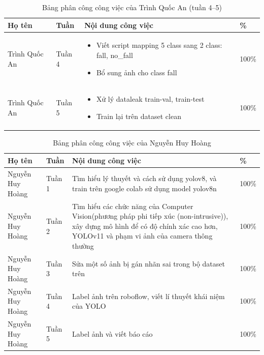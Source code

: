 \documentclass[12pt, a4paper]{article}
\begin{document}
\begin{table}[H]
  \centering
  \caption{Bảng phân công công việc của Trình Quốc An (tuần 4--5)}
  \label{tab:work_assignment_an_2}
  \renewcommand{\arraystretch}{1.2}
  \begin{tabularx}{\textwidth}{@{}p{3.6cm}p{1.4cm}X p{1.1cm}@{}}
    \toprule
    \textbf{Họ tên} & \textbf{Tuần} & \textbf{Nội dung công việc} & \textbf{\%} \\
    \midrule
    \addlinespace
    Trình Quốc An & Tuần 4 &
    \begin{itemize}[nosep, leftmargin=*]
      \item Viết script mapping 5 class sang 2 class: fall, no\_fall
      \item Bổ sung ảnh cho class fall
    \end{itemize}
    & 100\% \\
    \addlinespace
    Trình Quốc An & Tuần 5 &
    \begin{itemize}[nosep, leftmargin=*]
      \item Xử lý dataleak train-val, train-test
      \item Train lại trên dataset clean
    \end{itemize}
    & 100\% \\
    \bottomrule
  \end{tabularx}
\end{table}

\begin{table}[H]
  \centering
  \caption{Bảng phân công công việc của Nguyễn Huy Hoàng}
  \label{tab:work_assignment_hoang}
  \renewcommand{\arraystretch}{1.2}
  \begin{tabularx}{\textwidth}{@{}p{3.6cm}p{1.4cm}X p{1.1cm}@{}}
    \toprule
    \textbf{Họ tên} & \textbf{Tuần} & \textbf{Nội dung công việc} & \textbf{\%} \\
    \midrule
    Nguyễn Huy Hoàng & Tuần 1 &
    Tìm hiểu lý thuyết và cách sử dụng yolov8, và train trên google colab sử dụng model yolov8n
    & 100\% \\
    \addlinespace
    Nguyễn Huy Hoàng & Tuần 2 &
    Tìm hiểu các chức năng của Computer Vision(phương pháp phi tiếp xúc (non-intrusive)), xây dựng mô hình để có độ chính xác cao hơn, YOLOv11 và phạm vi ảnh của camera thông thường
    & 100\% \\
    \addlinespace
    Nguyễn Huy Hoàng & Tuần 3 &
    Sửa một số ảnh bị gán nhãn sai trong bộ dataset trên
    & 100\% \\
    \addlinespace
    Nguyễn Huy Hoàng & Tuần 4 &
    Label ảnh trên roboflow, viết lí thuyết khái niệm của YOLO
    & 100\% \\
    \addlinespace
    Nguyễn Huy Hoàng & Tuần 5 &
    Label ảnh và viết báo cáo
    & 100\% \\
    \bottomrule
  \end{tabularx}
\end{table}
\end{document}
